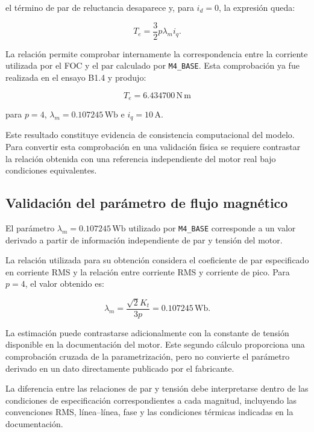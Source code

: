 el término de par de reluctancia desaparece y, para \(i_d=0\), la expresión queda:

\begin{equation}
T_e=
\frac{3}{2}
p\lambda_m i_q.
\end{equation}

La relación permite comprobar internamente la correspondencia entre la corriente utilizada por el FOC y el par calculado por \texttt{M4\_BASE}. Esta comprobación ya fue realizada en el ensayo B1.4 y produjo:

\begin{equation}
T_e=6.434700\,\mathrm{N\,m}
\end{equation}

para \(p=4\), \(\lambda_m=0.107245\,\mathrm{Wb}\) e \(i_q=10\,\mathrm{A}\).

Este resultado constituye evidencia de consistencia computacional del modelo. Para convertir esta comprobación en una validación física se requiere contrastar la relación obtenida con una referencia independiente del motor real bajo condiciones equivalentes.

\subsection{Validación del parámetro de flujo magnético}

El parámetro \(\lambda_m=0.107245\,\mathrm{Wb}\) utilizado por \texttt{M4\_BASE} corresponde a un valor derivado a partir de información independiente de par y tensión del motor.

La relación utilizada para su obtención considera el coeficiente de par especificado en corriente RMS y la relación entre corriente RMS y corriente de pico. Para \(p=4\), el valor obtenido es:

\begin{equation}
\lambda_m=
\frac{\sqrt{2}K_t}{3p}
=
0.107245\,\mathrm{Wb}.
\end{equation}

La estimación puede contrastarse adicionalmente con la constante de tensión disponible en la documentación del motor. Este segundo cálculo proporciona una comprobación cruzada de la parametrización, pero no convierte el parámetro derivado en un dato directamente publicado por el fabricante.

La diferencia entre las relaciones de par y tensión debe interpretarse dentro de las condiciones de especificación correspondientes a cada magnitud, incluyendo las convenciones RMS, línea--línea, fase y las condiciones térmicas indicadas en la documentación.

